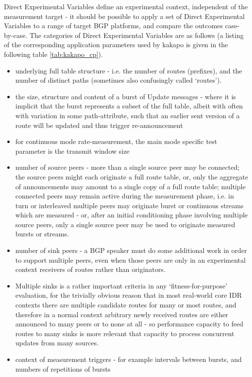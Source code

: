 Direct Experimental Variables define an experimental context, independent of the measurement target - it should be possible to apply a set of Direct Experimental Variables to a range of target BGP platforms, and compare the outcomes case-by-case.
The categories of Direct Experimental Variables are as follows (a listing of the corresponding application parameters used by kakapo is given in the following table \ref{tab:kakapo_cp}).
\begin{itemize}
    \item underlying full table structure - i.e. the number of routes (prefixes), and the number of distinct paths (sometimes also confusingly called `routes').
    \item the size, structure and content of a burst of Update messages - where  it is implicit that the burst represents a subset of the full table, albeit with often with variation in some path-attribute, such that an earlier sent version of a route will be updated and thus trigger re-announcement
    \item for continuous mode rate-measurement, the main mode specific test parameter is the transmit window size
    \item number of source peers - more than a single source peer may be connected; the source peers might each originate a full route table, or, only the aggregate of announcements may amount to a single copy of a full route table; multiple connected peers may remain active during the measurement phase, i.e. in turn or interleaved multiple peers may originate burst or continuous streams which are measured - or, after an initial conditioning phase involving multiple source peers, only a single source peer may be used to originate measured bursts or streams.
    \item number of sink peers - a BGP speaker must do some additional work in order to support multiple peers, even when those peers are only in an experimental context receivers of routes rather than originators.
    \item Multiple sinks is a rather important criteria in any `fitness-for-purpose' evaluation, for the trivially obvious reason that in most real-world core IDR contexts there are multiple candidate routes for many or most routes, and therefore in a normal context arbitrary newly received routes are either announced to many peers or to none at all - so performance capacity to feed routes to many sinks is more relevant that capacity to process concurrent updates from many sources.
    \item context of measurement triggers - for example intervals between bursts, and numbers of repetitions of bursts
\end{itemize}


